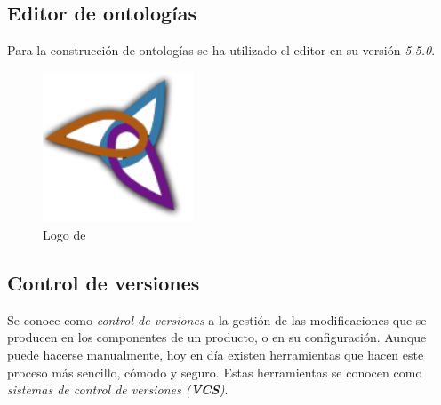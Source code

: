 \subsection{Editor de ontologías}
\label{Editor_ontologias}
Para la construcción de ontologías se ha utilizado el editor 
\protege en su versión \textit{5.5.0}.

\begin{figure}[H]
    \centering
    \begin{minipage}{0.38\textwidth}
        \centering
        \includegraphics[width=0.4\textwidth]{Figures/Logo_Protege.pdf}
        \caption{Logo de \protege}
    \end{minipage}
\end{figure}

\subsection{Control de versiones}
Se conoce como \textit{control de versiones} a la gestión de las modificaciones que se producen en los componentes de un producto, o en 
su configuración. Aunque puede hacerse manualmente, hoy en día existen herramientas que hacen este proceso más sencillo, cómodo y 
seguro. Estas herramientas se conocen como \textit{sistemas de control de versiones (\textbf{VCS})}.\medskip

